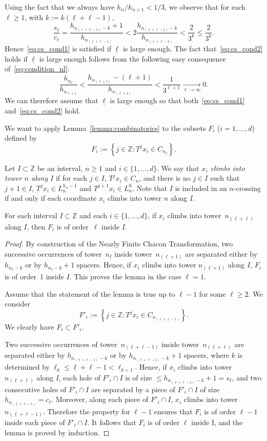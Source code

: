 \documentclass[AHL,Unicode,longabstracts]{cedram}
\newcommand{\egdef}{:=}
\newcommand{\tend}[3][]{\xrightarrow[#2\to#3]{#1}}
\newcommand{\ZZ}{\mathbb{Z}}
\newcommand{\lb}{\underline{\ell}}
\newcommand{\kb}{\underline{k}}
\begin{document}
Using the fact that we always have $h_n/h_{n+1}<1/3$, we observe that for each $\ell\ge1$, with $k\egdef k(\lb+\ell-1)$,
\[
\frac{s_\ell}{c_\ell} = \frac{h_{n_{(\lb+\ell-1)}-k} + 1}{h_{n_{(\lb+\ell-1)}}} < 2 \frac{h_{n_{(\lb+\ell-1)}-k}}{h_{n_{(\lb+\ell-1)}}} < \frac{2}{3^k} \le \frac{2}{3^{\kb}}.
\]
Hence~\eqref{eq:cs_cond1} is satisfied if $\lb$ is large enough. The fact that~\eqref{eq:cs_cond2} holds if $\lb$ is large enough follows from the following easy consequence of~\eqref{eq:condition_nl}:
\[
\frac{h_{n_\ell}}{h_{n_{\ell+1}}} < \frac{ h_{n_{(\ell+1)}}-(\ell+1) }{ h_{n_{(\ell+1)}} } < \frac{1}{3^{\ell+1}} \tend{\ell}{\infty} 0.
\]
We can therefore assume that $\lb$ is large enough so that both~\eqref{eq:cs_cond1} and~\eqref{eq:cs_cond2} hold.

We want to apply Lemma~\ref{lemma:combinatorics} to the subsets $F_i$ ($i=1,\ldots,d$) defined by
\[
F_i \egdef \left\{j\in\ZZ: T^j x_i \in C_{n_{\lb}} \right\}.
\]

Let $I\subset\ZZ$ be an interval, $n\ge1$ and $i\in\{1,\ldots,d\}$. We say that
\emph{$x_i$ climbs into tower $n$ along $I$} if for each $j\in I$, $T^jx_i\in C_n$, and there is no $j\in I$ such that $j+1\in I$, $T^jx_i\in L_n^{h_n-1}$ and $T^{j+1}x_i\in L_n^{0}$. Note that $I$ is included in an $n$-crossing if and only if each coordinate $x_i$ climbs into tower $n$ along $I$.

\begin{lemm}\label{lemma:order}
For each interval $I\subset\ZZ$ and each $i\in\{1,\ldots,d\}$, if $x_i$ climbs into tower~$n_{(\lb+\ell)}$ along $I$, then $F_i$ is of order~$\ell$ inside $I$.
\end{lemm}

\begin{proof}
By construction of the Nearly Finite Chacon Transformation, two successive occurrences of tower~$n_{\lb}$ inside tower~$n_{(\lb+1)}$ are separated either by $h_{n_{\lb}-\kb}$ or by $h_{n_{\lb}-\kb}+1$ spacers. Hence, if $x_i$ climbs into tower $n_{(\lb+1)}$ along $I$, $F_i$ is of order~1 inside $I$. This proves the lemma in the case $\ell=1$.

Assume that the statement of the lemma is true up to $\ell-1$ for some $\ell\ge2$. We consider
\[
F'_i \egdef \left\{j\in\ZZ: T^j x_i \in C_{n_{(\lb+\ell-1)}} \right\}.
\]
We clearly have $F_i\subset F'_i$.

Two successive occurrences of tower~$n_{(\lb+\ell-1)}$ inside tower~$n_{(\lb+\ell)}$ are separated either by $h_{n_{(\lb+\ell-1)}-k}$ or by $h_{n_{(\lb+\ell-1)}-k}+1$ spacers, where $k$ is determined by $\ell_k\le \lb+\ell-1 <\ell_{k+1}$. Hence, if $x_i$ climbs into tower $n_{(\lb+\ell)}$ along $I$, each hole of $F'_i\cap I$ is of size $\le h_{n_{(\lb+\ell-1)}-k}+1=s_\ell$, and two consecutive holes of $F'_i\cap I$ are separated by a piece of $F'_i\cap I$ of size $h_{n_{(\lb+\ell-1)}}=c_\ell$. Moreover, along each piece of $F'_i\cap I$, $x_i$ climbs into tower~$n_{(\lb+\ell-1)}$. Therefore the property for $\ell-1$ ensures that $F_i$ is of order $\ell-1$ inside each piece of $F'_i\cap I$. It follows that $F_i$ is of order $\ell$ inside I, and the lemma is proved by induction.
\end{proof}
\end{document}
